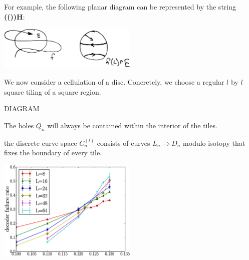 \documentclass[12pt,a4paper]{article}
\begin{document}
For example, the following planar diagram can be represented by
the string {\bf(())H}:

\begin{center}
\includegraphics[width=0.5\textwidth]{planar.eps}
\end{center}




We now consider a cellulation of a disc.
Concretely, we choose a regular $l$ by $l$ square tiling of a square region.

DIAGRAM

The holes $Q_n$ will always be contained within the interior of the
tiles.

 the discrete curve space $C_n^{(l)}$ consists of
curves $L_n\to D_n$ modulo isotopy that fixes the boundary of
every tile.







\begin{center}
\includegraphics[width=0.5\textwidth]{threshold-graph.eps}
\end{center}

\end{document}
